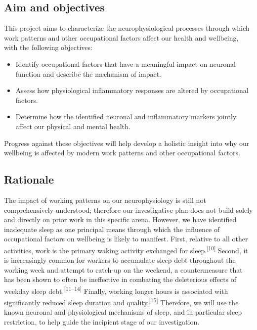 \documentclass[
  english,
  man, donotrepeattitle]{apa6}
\providecommand{\tightlist}{%
  \setlength{\itemsep}{0pt}\setlength{\parskip}{0pt}}
\begin{document}
\hypertarget{aim-and-objectives}{%
\subsection{Aim and objectives}\label{aim-and-objectives}}

This project aims to characterize the neurophysiological processes through which work patterns and other occupational factors affect our health and wellbeing, with the following objectives:

\begin{itemize}
\tightlist
\item
  Identify occupational factors that have a meaningful impact on neuronal function and describe the mechanism of impact.
\item
  Assess how physiological inflammatory responses are altered by occupational factors.
\item
  Determine how the identified neuronal and inflammatory markers jointly affect our physical and mental health.
\end{itemize}

Progress against these objectives will help develop a holistic insight into why our wellbeing is affected by modern work patterns and other occupational factors.

\newpage

\hypertarget{rationale}{%
\subsection{Rationale}\label{rationale}}

The impact of working patterns on our neurophysiology is still not comprehensively understood; therefore our investigative plan does not build solely and directly on prior work in this specific arena. However, we have identified inadequate sleep as one principal means through which the influence of occupational factors on wellbeing is likely to manifest. First, relative to all other activities, work is the primary waking activity exchanged for sleep.\textsuperscript{{[}10{]}} Second, it is increasingly common for workers to accumulate sleep debt throughout the working week and attempt to catch-up on the weekend, a countermeasure that has been shown to often be ineffective in combating the deleterious effects of weekday sleep debt.\textsuperscript{{[}11--14{]}} Finally, working longer hours is associated with significantly reduced sleep duration and quality.\textsuperscript{{[}15{]}} Therefore, we will use the known neuronal and physiological mechanisms of sleep, and in particular sleep restriction, to help guide the incipient stage of our investigation.
\end{document}
